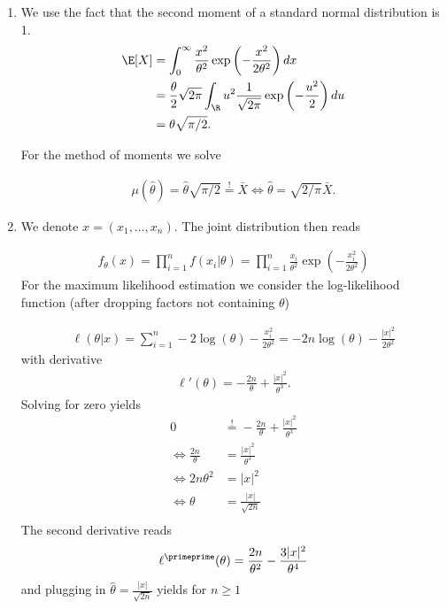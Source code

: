 \begin{solution}

\phantom{}

\begin{enumerate}[label = (\alph*)]
  \item We use the fact that the second moment of a standard normal distribution is 1.
  \begin{align*}
    \E[X] &= \int_0^{\infty} \frac{x^2}{\theta^2}\exp\left(-\frac{x^2}{2\theta^2}\right) dx \\
    &= \frac{\theta}{2}\sqrt{2\pi}\int_\R u^2\frac{1}{\sqrt{2\pi}}\exp\left(-\frac{u^2}{2}\right) du \\
    &= \theta\sqrt{\pi/2}.
  \end{align*}

  For the method of moments we solve

  \begin{align*}
    \mu(\hat{\theta}) = \hat{\theta}\sqrt{\pi/2} \stackrel{!}{=} \bar{X}
    \iff \hat{\theta} = \sqrt{2/\pi}\bar{X}.
  \end{align*}

  \item We denote $x = (x_1,\dots,x_n)$. The joint distribution then reads
  
  \begin{align*}
    f_\theta(x) = \prod_{i=1}^n f(x_i|\theta) = 
    \prod_{i=1}^n\frac{x_i}{\theta^2}\exp\left(-\frac{x_i^2}{2\theta^2}\right)
  \end{align*}
  For the maximum likelihood estimation we consider the log-likelihood function
  (after dropping factors not containing $\theta$)

  \begin{align*}
    \ell(\theta|x) = \sum_{i=1}^n -2\log(\theta) - \frac{x_i^2}{2\theta^2}
    = -2n\log(\theta) - \frac{|x|^2}{2\theta^2}
  \end{align*}
  with derivative
  \begin{align}
    \ell'(\theta) = -\frac{2n}{\theta} + \frac{|x|^2}{\theta^3}.
  \end{align}
  Solving for zero yields
  \begin{align*}
    0 &\stackrel{!}{=} -\frac{2n}{\theta} + \frac{|x|^2}{\theta^3} \\
    \iff \frac{2n}{\theta} &= \frac{|x|^2}{\theta^3} \\
    \iff 2n\theta^2 &= |x|^2 \\
    \iff \theta &= \frac{|x|}{\sqrt{2n}} \\
  \end{align*}
  The second derivative reads
  \begin{align*}
    \ell^{\primeprime}(\theta) = \frac{2n}{\theta^2} - \frac{3|x|^2}{\theta^4}
  \end{align*}
  and plugging in $\hat{\theta} = \frac{|x|}{\sqrt{2n}}$ yields for $n \geq 1$


\end{enumerate}
\end{solution}

